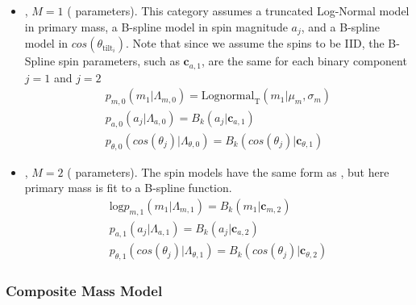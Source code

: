 
\begin{itemize}
    \item \first{}, $M=1$ ( parameters). This category assumes a truncated Log-Normal model in primary mass, a B-spline model in spin magnitude $a_j$, and a B-spline model in $cos(\theta_{\text{tilt}_i})$. Note that since we assume the spins to be IID, the B-Spline spin parameters, such as $\mathbf{c}_{a,1}$, are the same for each binary component $j=1$ and $j=2$
    \begin{eqnarray} \label{eq:lowmass}
        p_{m,0}(m_1| \Lambda_{m,0}) = \text{Lognormal}_\text{T}(m_1 | \mu_{m}, \sigma_{m}) \\
        p_{a,0}(a_j| \Lambda_{a,0}) = B_k(a_j | \mathbf{c}_{a,1}) \\
        p_{\theta,0}(cos(\theta_j)| \Lambda_{\theta,0}) = B_k( cos(\theta_j) | \mathbf{c}_{\theta,1})
    \end{eqnarray}

    \item \contB{}, $M=2$ ( parameters). The spin models have the same form as \first{}, but here primary mass is fit to a B-spline function. 
    \begin{eqnarray} \label{eq:contmass}
        \text{log} p_{m,1}(m_1| \Lambda_{m,1}) = B_k(m_1 | \mathbf{c}_{m, 2}) \\
        p_{a,1}(a_j| \Lambda_{a,1}) = B_k(a_j | \mathbf{c}_{a,2}) \\
        p_{\theta,1}(cos(\theta_j)| \Lambda_{\theta,1}) = B_k( cos(\theta_j) | \mathbf{c}_{\theta,2})
    \end{eqnarray}
    
\end{itemize}

\subsubsection{Composite Mass Model}

